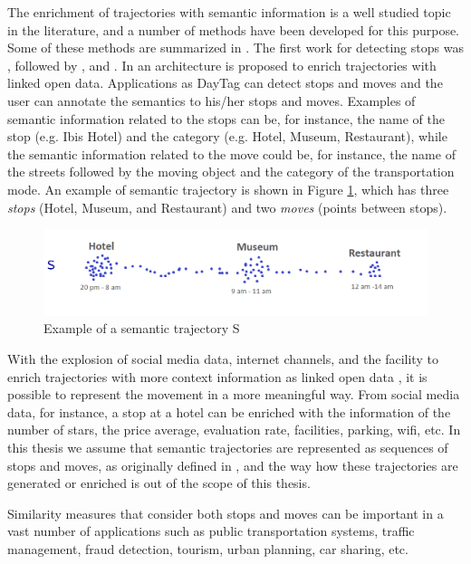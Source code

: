 The enrichment of trajectories with semantic information is a well studied topic in the literature, and a number of methods have been developed for this purpose. Some of these methods are summarized in \cite{bogorny2012introduccao}. The first work for detecting stops was \cite{alvares2007model}, followed by \cite{Palma2008}, and \cite{manso}. In \cite{fileto2013baquara} an architecture is proposed to enrich trajectories with linked open data. Applications as DayTag \cite{fernando2013} can detect stops and moves and the user can annotate the semantics to his/her stops and moves. Examples of semantic information related to the stops can be, for instance, the name of the stop (e.g. Ibis Hotel) and the category (e.g. Hotel, Museum, Restaurant), while the semantic information related to the move could be, for instance, the name of the streets followed by the moving object and the category of the transportation mode. An example of semantic trajectory is shown in Figure \ref{fig:example_semantic_trajectory}, which has three \emph{stops} (Hotel, Museum, and Restaurant) and two \emph{moves} (points between stops).

\begin{figure}[ht]
\centering
\includegraphics[width=1.0\textwidth]{Images/example_semantic-trajectory.png}
\caption{Example of a semantic trajectory S}
\label{fig:example_semantic_trajectory}
\end{figure}

With the explosion of social media data, internet channels, and the facility to enrich trajectories with more context information as linked open data \cite{fileto2013baquara}, it is possible to represent the movement in a more meaningful way. From social media data, for instance, a stop at a hotel can be enriched with the information of the number of stars, the price average, evaluation rate, facilities, parking, wifi, etc.  In this thesis we assume that semantic trajectories are represented as sequences of stops and moves, as originally defined in \cite{Spaccapietra:2008:CVT:1347466.1347785}, and the way how these trajectories are generated or enriched is out of the scope of this thesis.

Similarity measures that consider both stops and moves can be important in a vast number of applications such as public transportation systems, traffic management, fraud detection, tourism, urban planning, car sharing, etc.


